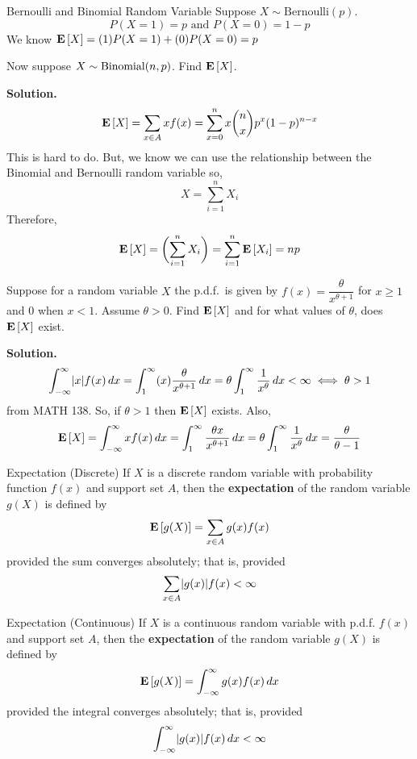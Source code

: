 \begin{Example}{Bernoulli and Binomial Random Variable}{}
    Suppose $ X \sim \text{Bernoulli}(p) $.
    \[ P(X=1)=p\text{ and }P(X=0)=1-p \]
    We know $ \bm{\mathrm{E}}\left[X\right]=(1)P(X=1)+(0)P(X=0)=p $

    Now suppose
    $ X \sim \operatorname{Binomial}(n,p) $. Find $ \bm{\mathrm{E}}\left[X\right] $.

    \textbf{Solution.}
    \[ \bm{\mathrm{E}}\left[X\right]=\sum\limits_{x\in A}x f(x)=\sum\limits_{x=0}^{n} x
        \binom{n}{x}p^x(1-p)^{n-x}  \]
    This is hard to do. But, we know we can use the
    relationship between the Binomial and Bernoulli random variable
    so,
    \[ X=\sum\limits_{i=1}^{n} X_i \]
    Therefore,
    \[ \bm{\mathrm{E}}\left[X\right]=\biggl(\sum\limits_{i=1}^{n} X_i\biggr)=\sum\limits_{i=1}^{n}
        \bm{\mathrm{E}}\left[X_i\right]=np \]
\end{Example}
\begin{Example}{}{}
    Suppose for a random variable $ X $ the p.d.f.\ is given by
    $ f(x)=\dfrac{\theta}{x^{\theta+1}} $
    for $ x\geqslant 1 $ and $ 0 $ when $ x<1 $. Assume $ \theta>0 $.
    Find $ \bm{\mathrm{E}}\left[X\right] $ and for what values of $ \theta $,
    does $ \bm{\mathrm{E}}\left[X\right] $ exist.

    \textbf{Solution.}
    \[ \int_{-\infty}^{\infty} \lvert x\rvert f(x)\, d{x}=
        \int_{1}^{\infty} (x) \frac{\theta}{x^{\theta+1}} \, d{x}
        =\theta \int_{1}^{\infty} \frac{1}{x^{\theta}} \, d{x} <\infty
        \iff \theta>1 \]
    from MATH 138. So, if $ \theta>1 $ then $ \bm{\mathrm{E}}\left[X\right] $ exists. Also,
    \[ \bm{\mathrm{E}}\left[X\right]=\int_{-\infty}^{\infty} xf(x)\, d{x}=
        \int_{1}^{\infty} \frac{\theta x}{x^{\theta+1}} \, d{x}
        =\theta \int_{1}^{\infty} \frac{1}{x^{\theta}} \, d{x}
        =\frac{\theta}{\theta-1}   \]

\end{Example}

\begin{Definition}{Expectation (Discrete)}{}
    If $ X $ is a discrete random variable with probability
    function $ f(x) $ and support set $ A $,
    then the \textbf{expectation} of the random variable $ g(X) $
    is defined by
    \[ \bm{\mathrm{E}}\left[g(X)\right]=\sum\limits_{x\in A}g(x)f(x) \]
    provided the sum converges absolutely; that is, provided
    \[ \sum\limits_{x\in A}\lvert g(x)\rvert f(x)<\infty \]
\end{Definition}

\begin{Definition}{Expectation (Continuous)}{}
    If $ X $ is a continuous random variable with p.d.f.
    $ f(x) $ and support set $ A $,
    then the \textbf{expectation} of the random variable $ g(X) $
    is defined by
    \[ \bm{\mathrm{E}}\left[g(X)\right]=\int_{-\infty}^{\infty} g(x)f(x)\, d{x} \]
    provided the integral converges absolutely; that is, provided
    \[ \int_{-\infty}^{\infty} \lvert g(x)\rvert f(x)\, d{x} <\infty \]
\end{Definition}

